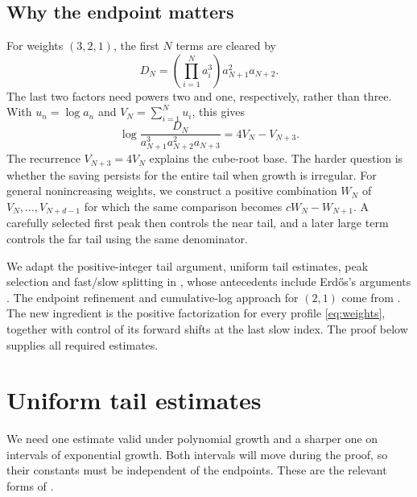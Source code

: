 \documentclass[11pt]{article}
\numberwithin{equation}{section}
\begin{document}
\subsection{Why the endpoint matters}

For weights $(3,2,1)$, the first $N$ terms are cleared by
\[
  D_N=\left(\prod_{i=1}^{N}a_i^3\right)a_{N+1}^2a_{N+2}.
\]
The last two factors need powers two and one, respectively, rather
than three. With $u_n=\log a_n$ and $V_N=\sum_{i=1}^N u_i$, this gives
\[
  \log\frac{D_N}{a_{N+1}^3a_{N+2}^2a_{N+3}}
  =4V_N-V_{N+3}.
\]
The recurrence $V_{N+3}=4V_N$ explains the cube-root base. The harder
question is whether the saving persists for the entire tail when
growth is irregular. For general nonincreasing weights, we construct
a positive combination $W_N$ of $V_N,\ldots,V_{N+d-1}$ for which the
same comparison becomes $cW_N-W_{N+1}$. A carefully selected first
peak then controls the near tail, and a later large term controls the
far tail using the same denominator.

We adapt the positive-integer tail argument, uniform tail estimates,
peak selection and fast/slow splitting in
\cite[Lemmas~8--10 and Proposition~12]{BKKKZ}, whose antecedents include
Erd\H{o}s's arguments \cite[pp.~3--6]{Erdos1975}.
The endpoint refinement and cumulative-log approach for $(2,1)$
come from \cite{Earlier}. The new ingredient is the positive
factorization for every profile \eqref{eq:weights}, together with
control of its forward shifts at the last slow index.
The proof below supplies all required estimates.

\section{Uniform tail estimates}\label{sec:tails}

We need one estimate valid under polynomial growth and a sharper one
on intervals of exponential growth. Both intervals will move during
the proof, so their constants must be independent of the endpoints.
These are the relevant forms of \cite[Lemma~10]{BKKKZ}.
\end{document}
